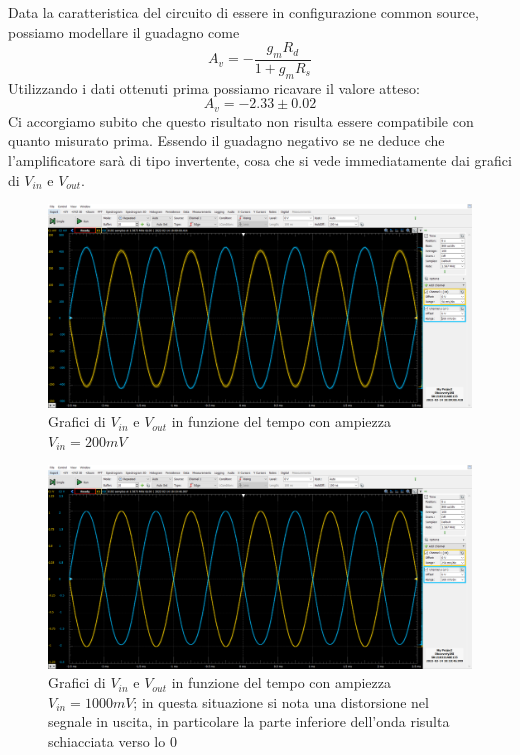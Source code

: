 \documentclass[10pt, a4paper, italian]{article}
\begin{document}
Data la caratteristica del circuito di essere in configurazione common source, possiamo modellare il guadagno come
\begin{equation}
A_v =-\frac{g_m R_d}{1+g_mR_s}
\end{equation}
Utilizzando i dati ottenuti prima possiamo ricavare il valore atteso:
\[
A_v=-2.33 \pm 0.02
\]
Ci accorgiamo subito che questo risultato non risulta essere compatibile con quanto misurato prima.
Essendo il guadagno negativo se ne deduce che l'amplificatore sarà di tipo invertente, cosa che si vede immediatamente dai grafici di $V_{in}$ e $V_{out}$.
\begin{figure}[H]
    \centering
	\includegraphics[scale=0.4]{amp.200}
    \caption{Grafici di $V_{in}$ e $V_{out}$ in funzione del tempo con ampiezza $V_{in}=200 mV$}
\end{figure}
\begin{figure}[H]
    \centering
	\includegraphics[scale=0.4]{amp.1000}
    \caption{Grafici di $V_{in}$ e $V_{out}$ in funzione del tempo con ampiezza $V_{in}=1000 mV$; in questa situazione si nota una distorsione nel segnale in uscita, in particolare la parte inferiore dell'onda risulta schiacciata verso lo 0}
\end{figure}
\end{document}
